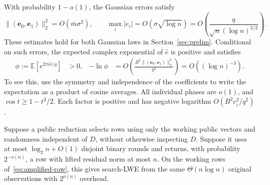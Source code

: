 \documentclass[runningheads,envcountsame,envcountsect,orivec]{llncs}
\begin{document}
With probability $1-o(1)$, the Gaussian errors satisfy
\[
 \| (\boldsymbol e_0,\boldsymbol e_1)\|_2^2=O(\bar m\sigma^2),
 \qquad
 \max_i|e_i|=O(\sigma\sqrt{\log n})
       =O\!\left(\frac{q}{\sqrt n(\log n)^{3/2}}\right).
\]
These estimates hold for both Gaussian laws in
Section~\ref{sec:prelim}. Conditional on such errors, the
expected complex exponential of $\widehat e$ is positive and satisfies
\begin{align}
 \phi:=\mathbb E[e^{2\pi i\widehat e/q}]&>0,
 &-\ln\phi&=O\!\left(
       \frac{B^2\|(\boldsymbol e_0,\boldsymbol e_1)\|_2^2}{q^2}
                        \right)
             =O((\log n)^{-3}).
 \label{eq:amplified-character}
\end{align}
To see this, use the symmetry and independence of the
coefficients to write the expectation as a product of
cosine averages. All individual phases
are $o(1)$, and $\cos t\ge1-t^2/2$. Each factor is positive
and has negative logarithm $O(B^2e_i^2/q^2)$.

\begin{lemma}
\label{lem:amplified-test}
Suppose a public reduction selects rows using only the working public
vectors and randomness independent of $D$, without otherwise inspecting $D$.
Suppose it uses at most $\log_2 n+O(1)$ disjoint binary rounds and returns, with probability
$2^{-o(n)}$, a row with lifted residual norm at most $n$.
On the working rows of~\eqref{eq:amplified-row}, this gives
search-LWE from the same $\Theta(n\log n)$ original
observations with $2^{o(n)}$ overhead.
\end{lemma}
\end{document}
